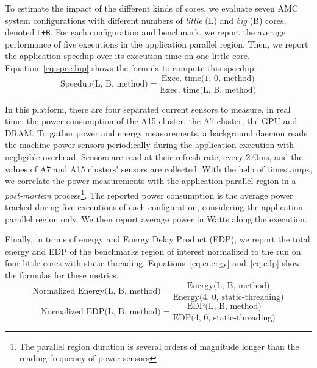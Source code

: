 To estimate the impact of the different kinds of cores, we evaluate seven AMC system configurations with different numbers of \textit{little} (L) and \textit{big} (B) cores, denoted \texttt{L+B}.
For each configuration and benchmark, we report the average performance of five executions in the application parallel region. 
Then, we report the application speedup over its execution time on one little core.
Equation~\ref{eq.speedup} shows the formula to compute this speedup.
\begingroup\makeatletter\def\f@size{9}\check@mathfonts
\begin{equation}
\text{Speedup(L, B, method)} = \frac{\text{Exec. time(1, 0, method)}}{\text{Exec. time(L, B, 
		method)}}
\label{eq.speedup}
\end{equation}
\endgroup


In this platform, there are four separated current sensors to measure, in real time, the power consumption of the A15 cluster, the A7 cluster, the GPU and DRAM. 
To gather power and energy measurements, a background daemon reads the machine power sensors periodically during the application execution with negligible overhead. 
Sensors are read at their refresh rate, every 270ms, and the values of A7 and A15 clusters' sensors are collected.
With the help of timestamps, we correlate the power measurements with the application parallel region in a \emph{post-mortem} process\footnote{The parallel region duration is several orders of magnitude longer than the reading frequency of power sensors}. 
The reported power consumption is the average power tracked during five executions of each configuration, considering the application parallel region only. 
We then report average power in Watts along the execution. 

Finally, in terms of energy and Energy Delay Product (EDP), we report the total energy and EDP of the benchmarks region of interest normalized to the run on four little cores with static threading.
Equations~\ref{eq.energy} and~\ref{eq.edp} show the formulas for these metrics.
\begingroup\makeatletter\def\f@size{8}\check@mathfonts
\begin{equation}
\text{Normalized Energy(L, B, method)} = \frac{\text{Energy(L, B, method)}}{\text{Energy(4, 0, static-threading)}}
\label{eq.energy}
\end{equation}
\begin{equation}
\text{Normalized EDP(L, B, method)} = \frac{\text{EDP(L, B, method)}}{\text{EDP(4, 0, static-threading)}}
\label{eq.edp}
\end{equation}
\endgroup




